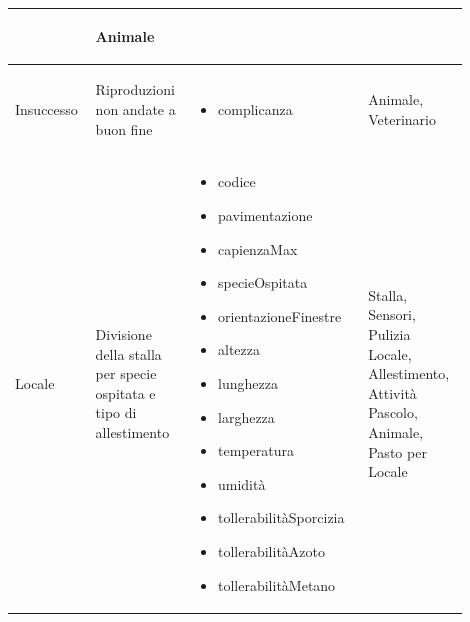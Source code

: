 \documentclass[12pt,a4paper]{article}
\begin{document}
\begin{center}
\begin{longtable}{|p{0.14\linewidth}|p{0.20\linewidth}|p{0.36\linewidth}|p{0.20\linewidth}|}
\begin{itemize}
					\end{itemize}
					& \begin{flushleft}\vspace{-25pt} Animale \end{flushleft}\\

\hline
Insuccesso				& \begin{flushleft}\vspace{-25pt} Riproduzioni non andate a buon fine \end{flushleft}
					& \begin{itemize}
						\setlength{\itemindent}{-1em}
						\vspace{-25pt}
						\setlength\itemsep{-0.25em}
						\item complicanza
					\end{itemize}
					& \begin{flushleft}\vspace{-25pt} Animale, Veterinario \end{flushleft}\\

\hline
Locale 				& \begin{flushleft}\vspace{-25pt} Divisione della stalla per specie ospitata e tipo di allestimento  \end{flushleft}
					& \begin{itemize}
						\setlength{\itemindent}{-1em}
						\vspace{-25pt}
						\setlength\itemsep{-0.25em}
						\item codice
						\item pavimentazione
						\item capienzaMax
						\item specieOspitata
						\item orientazioneFinestre
						\item altezza
						\item lunghezza
						\item larghezza
						\item temperatura
						\item umidità
						\item tollerabilitàSporcizia
						\item tollerabilitàAzoto
						\item tollerabilitàMetano
						
					\end{itemize}
					& \begin{flushleft}\vspace{-25pt} Stalla, Sensori, Pulizia Locale, Allestimento, Attività Pascolo, Animale, Pasto per Locale\end{flushleft} \\


\end{longtable}
\end{center}
\end{document}
